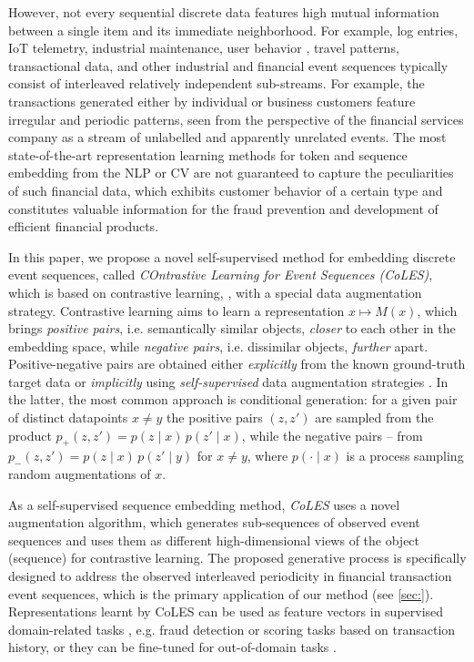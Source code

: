 \documentclass[sigconf, anonymous]{acmart}
\begin{document}
However, not every sequential discrete data features high mutual information between a single
item and its immediate neighborhood. For example, log entries, IoT telemetry, industrial
maintenance, user behavior \citep{Ni2018PerceiveYU}, travel patterns, transactional data,
and other industrial and financial event sequences typically consist of interleaved relatively
independent sub-streams.
%
For example, the transactions generated either by individual or business customers feature
irregular and periodic patterns, seen from the perspective of the financial services company
as a stream of unlabelled and apparently unrelated events. The most state-of-the-art
representation learning methods for token and sequence embedding from the NLP or CV are
not guaranteed to capture the peculiarities of such financial data, which exhibits customer
behavior of a certain type and constitutes valuable information for the fraud prevention
and development of efficient financial products.

In this paper, we propose a novel self-supervised method for embedding discrete event
sequences, called \emph{COntrastive Learning for Event Sequences (CoLES)}, which is based
on contrastive learning, \citep{Xing2002DistanceML, Hadsell2006DimensionalityRB}, with
a special data augmentation strategy.
% 
Contrastive learning aims to learn a representation $x \mapsto M(x)$, which brings
\emph{positive pairs}, i.e. semantically similar objects, \emph{closer} to each other
in the embedding space, while \emph{negative pairs}, i.e. dissimilar objects, \emph{further}
apart.
%
Positive-negative pairs are obtained either \emph{explicitly} from the known ground-truth
target data or \emph{implicitly} using \emph{self-supervised} data augmentation strategies
\citep{Falcon2020AFF}. In the latter, the most common approach is conditional generation:
for a given pair of distinct datapoints $x \neq y$ the positive pairs $(z, z')$ are sampled
from the product $
  p_+(z, z') = p(z \mid x) \,p(z' \mid x) 
$, while the negative pairs -- from $
  p_-(z, z') = p(z \mid x) \,p(z' \mid y)
$ for $x \neq y$, where $
  p(\cdot \mid x)
$ is a process sampling random augmentations of $x$.

As a self-supervised sequence embedding method, \emph{CoLES} uses a novel augmentation
algorithm, which generates sub-sequences of observed event sequences and uses them as
different high-dimensional views of the object (sequence) for contrastive learning.
%
The proposed generative process is specifically designed to address the observed interleaved
periodicity in financial transaction event sequences, which is the primary application of
our method (see \ref{sec:}). Representations learnt by CoLES can be used as feature vectors
in supervised domain-related tasks \citep{Mikolov2013EfficientEO,Song2017LearningUE,Zhai2019LearningAU},
e.g. fraud detection or scoring tasks based on transaction history, or they can be fine-tuned
for out-of-domain tasks \citep{Yosinski2014HowTA}.
\end{document}
